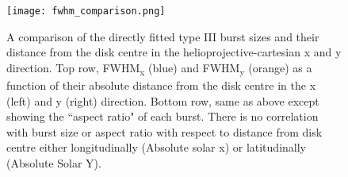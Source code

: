 
\begin{figure}[ht]
\centering
\texttt{[image: fwhm\_comparison.png]}
\caption[Directly fitted type III burst sizes as a function of position relative to disk centre.]{A comparison of the directly fitted type III burst sizes and their distance from the disk centre in the helioprojective-cartesian x and y direction. Top row, FWHM\textsubscript{x} (blue) and FWHM\textsubscript{y} (orange) as a function of their absolute distance from the disk centre in the x (left) and y (right) direction. Bottom row, same as above except showing the ``aspect ratio" of each burst. There is no correlation with burst size or aspect ratio with respect to distance from disk centre either longitudinally (Absolute solar x) or latitudinally (Absolute Solar Y).}
\label{fig:fwhm_comp}
\end{figure}

